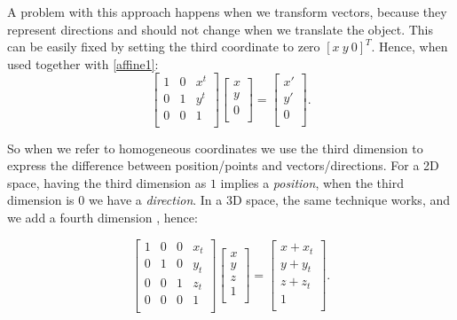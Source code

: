 \documentclass[cic,tc,english]{iiufrgs}
\begin{document}
A problem with this approach happens when we transform vectors, because they represent directions and should not change when we translate the object. This can be easily fixed by setting the third coordinate to zero $[x\ y\ 0]^T$. Hence, when used together with \cref{affine1}:
\begin{equation}
    \begin{bmatrix}
      1 & 0 & x^t \\
      0 & 1 & y^t \\
      0 & 0 & 1   \\
    \end{bmatrix}
    \begin{bmatrix}
       x \\
       y \\
       0 \\
    \end{bmatrix}
    =
    \begin{bmatrix}
       x' \\
       y' \\
       0  \\
    \end{bmatrix}
    .
\end{equation}

So when we refer to homogeneous coordinates we use the third dimension to express the difference between position/points and vectors/directions. For a 2D space, having the third dimension as $1$ implies a \textit{position}, when the third dimension is $0$ we have a \textit{direction}. In a 3D space, the same technique works, and we add a fourth dimension \cite{Marschner2021CGFundamentals}, hence:

\begin{equation}
    \begin{bmatrix}
      1 & 0 & 0 & x_t \\
      0 & 1 & 0 & y_t \\
      0 & 0 & 1 & z_t \\
      0 & 0 & 0 & 1   \\
    \end{bmatrix}
    \begin{bmatrix}
       x \\
       y \\
       z \\
       1 \\
    \end{bmatrix}
    =
    \begin{bmatrix}
       x + x_t \\
       y + y_t \\
       z + z_t \\
       1 \\
    \end{bmatrix}
    .
\end{equation}
\end{document}
